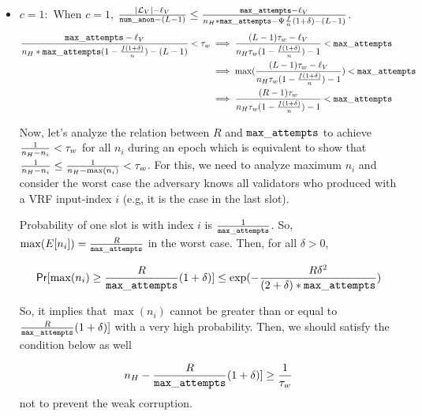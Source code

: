 \begin{itemize}
	\item $ c = 1: $ When $ c =1 $, $ \frac{|\mathcal{L}_V|- \ell_V}{\mathtt{num\_anon}-(L-1)} \leq \frac{\mathtt{max\_attempts} - \ell_V}{n_H*\mathtt{max\_attempts} -  \Psi \frac{f}{n} (1+ \delta)- (L-1)} $.
	\begin{align}\label{cond:eq1}
	\frac{\mathtt{max\_attempts} - \ell_V}{n_H*\mathtt{max\_attempts}(1-\frac{f(1+\delta)}{n}) - (L-1)} < \tau_w &\implies \frac{(L-1)\tau_w - \ell_V}{n_H\tau_w(1-\frac{f(1+\delta)}{n})-1} < \mathtt{max\_attempts} \nonumber \\
	&\implies \max(\frac{(L-1)\tau_w - \ell_V}{n_H\tau_w(1-\frac{f(1+\delta)}{n})-1}) < \mathtt{max\_attempts} \nonumber\\
	&\implies \frac{(R-1)\tau_w}{n_H\tau_w(1-\frac{f(1+\delta)}{n}) - 1} < \mathtt{max\_attempts} 
	\end{align}
	
	Now, let's analyze the relation between $ R $ and $ \mathtt{max\_attempts} $ to achieve $ \frac{1}{n_H - n_i} < \tau_w  $ for all $ n_i $ during an epoch which is equivalent to show that $\frac{1}{n_H - n_i}  \leq  \frac{1}{n_H - \max(n_i)} < \tau_w  $. For this, we need to analyze maximum $ n_i $ and consider the worst case the adversary knows all validators who produced with a VRF input-index $ i $ (e.g, it is the case in the last slot).
	
	Probability of one slot is with index $ i $ is $ \frac{1}{\mathtt{max\_attempts}} $. So, $ \max(E[n_{i}]) = \frac{R}{\mathtt{max\_attempts}} $ in the worst case. Then, for all $ \delta > 0 $,  
	
	
	\begin{equation}
	\mathsf{Pr}[\max(n_{i}) \geq \frac{R}{\mathtt{max\_attempts}} (1+\delta)] \leq \exp(-\frac{R\delta^2}{(2+\delta)*\mathtt{max\_attempts}})  \nonumber
	\end{equation} 
	
	So, it implies that $ \max(n_i) $ cannot be greater than or equal to $ \frac{R}{\mathtt{max\_attempts}} (1+\delta)] $ with a very high probability. Then, we should satisfy the condition below as well
	
	\begin{equation}\label{cond:neq1}
	n_H -\frac{R}{\mathtt{max\_attempts}} (1+\delta)]  \geq \frac{1}{\tau_w} 
	\end{equation}
	not to prevent the weak corruption.
	

\end{itemize}
